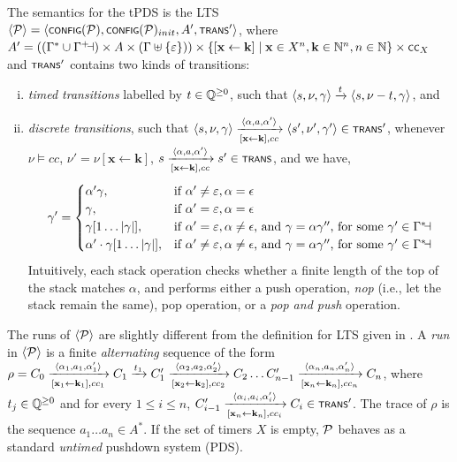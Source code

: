 The semantics for the tPDS is the LTS $\tup{\cal P} = \tup{\config{\cal P},\config{\cal P}_{init},A',\trans'}$, where $A' = ((\Gamma^*\cup\Gamma^+\bottom) \times A \times (\Gamma \uplus \{\varepsilon\})) \times \{[\mathbf{x} \leftarrow \mathbf{k}] \mid \mathbf{x} \in X^n, \mathbf{k} \in \nat^n, n \in \nat \} \times \scrsf{cc}_X$ and $\trans'$ contains two kinds of transitions:
\begin{enumerate}[(i)]
	\item \emph{timed transitions} labelled by $t \in \rat^{\geq 0}$, such that $\tup{s, \nu, \gamma} \xrightarrow{t} \tup{s, \nu - t, \gamma}$, and
	\item \emph{discrete transitions}, such that $\tup{s, \nu, \gamma} \xrightarrow[{[\mathbf{x} \leftarrow \mathbf{k}]},cc]{\tup{\alpha,a,\alpha'}} \tup{s',\nu',\gamma'}\in \trans'$, whenever $\nu \models cc$, $\nu' = \nu[\mathbf{x} \leftarrow \mathbf{k}]$, $s \xrightarrow[{[\mathbf{x} \leftarrow \mathbf{k}]},cc]{\tup{\alpha,a,\alpha'}} s' \in \trans$, and we have, 
	\[\gamma' = \begin{cases}
		\alpha'\gamma, & \text{if } \alpha' \neq \varepsilon,\alpha = \epsilon\\
		\gamma, & \text{if } \alpha' = \varepsilon,\alpha = \epsilon\\
		\gamma[1\ldots|\gamma|], & \text{if } \alpha' = \varepsilon,\alpha \neq \epsilon \text{, and } \gamma = \alpha\gamma'' \text{, for some } \gamma'\in \Gamma^*\bottom\\
		\alpha'\cdot\gamma[1\ldots|\gamma|], & \text{if } \alpha' \neq \varepsilon,\alpha \neq \epsilon \text{, and } \gamma = \alpha\gamma'' \text{, for some } \gamma'\in \Gamma^*\bottom
	\end{cases}\]
	Intuitively, each stack operation checks whether a finite length of the top of the stack matches $\alpha$, and performs either a push operation, \emph{nop} (i.e., let the stack remain the same), pop operation, or a \emph{pop and push} operation. 
\end{enumerate}
The runs of $\tup{\cal P}$ are slightly different from the definition for LTS given in . A \emph{run} in $\tup{\cal P}$ is a finite \emph{alternating} sequence of the form $\rho = C_0 \xrightarrow[{[\mathbf{x}_1 \leftarrow \mathbf{k}_1]}, cc_1]{\tup{\alpha_1,a_1,\alpha'_1}} C_1 \xrightarrow{t_1} C_1' \xrightarrow[{[\mathbf{x}_2 \leftarrow \mathbf{k}_2]}, cc_2]{\tup{\alpha_2,a_2,\alpha'_2}} C_2 \ldots C_{n-1}' \xrightarrow[{[\mathbf{x}_n \leftarrow \mathbf{k}_n]}, cc_n]{\tup{\alpha_n,a_n,\alpha'_n}} C_n$, where $t_j \in \rat^{\geq 0}$ and for every $1 \leq i \leq n$, $C_{i-1}' \xrightarrow[{[\mathbf{x}_n \leftarrow \mathbf{k}_n]}, cc_i]{\tup{\alpha_i,a_i,\alpha'_i}} C_i \in \scrsf{trans}'$. The trace of $\rho$ is the sequence $a_1\ldots a_n \in A^*$. If the set of timers $X$ is empty, $\cal P$ behaves as a standard \emph{untimed} pushdown system (PDS).

